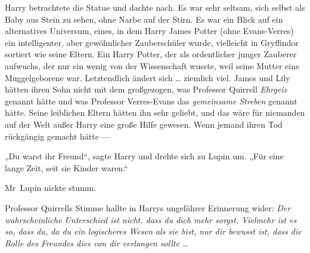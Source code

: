 Harry betrachtete die Statue und dachte nach. Es war sehr seltsam, sich selbst als Baby aus Stein zu sehen, ohne Narbe auf der Stirn. Es war ein Blick auf ein alternatives Universum, eines, in dem Harry James Potter (ohne Evans-Verres) ein intelligenter, aber gewöhnlicher Zauberschüler wurde, vielleicht in Gryffindor sortiert wie seine Eltern. Ein Harry Potter, der als ordentlicher junger Zauberer aufwuchs, der nur ein wenig von der Wissenschaft wusste, weil seine Mutter eine Muggelgeborene war. Letztendlich ändert sich … ziemlich viel. James und Lily hätten ihren Sohn nicht mit dem großgezogen, was Professor Quirrell \emph{Ehrgeiz} genannt hätte und was Professor Verres-Evans das \emph{gemeinsame Streben} genannt hätte. Seine leiblichen Eltern hätten ihn sehr geliebt, und das wäre für niemanden auf der Welt außer Harry eine große Hilfe gewesen. Wenn jemand ihren Tod rückgängig gemacht hätte —

„Du warst ihr Freund“, sagte Harry und drehte sich zu Lupin um.
„Für eine lange Zeit, seit sie Kinder waren.“

Mr~Lupin nickte stumm.

Professor Quirrells Stimme hallte in Harrys ungefährer Erinnerung wider: \emph{Der wahrscheinliche Unterschied ist nicht, dass du dich mehr sorgst. Vielmehr ist es so, dass du, da du ein logischeres Wesen als sie bist, nur dir bewusst ist, dass die Rolle des Freundes dies von dir verlangen sollte …}

